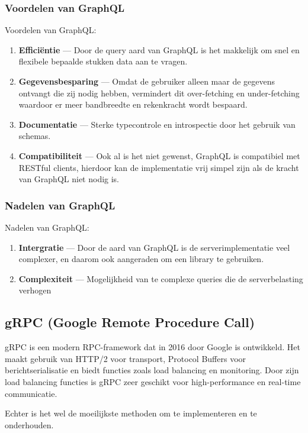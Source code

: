 \subsubsection{Voordelen van GraphQL}
Voordelen van GraphQL:
\begin{enumerate}
    \item \textbf{Efficiëntie} --- Door de query aard van GraphQL is het
     makkelijk om snel en flexibele bepaalde stukken data aan te vragen.
    \item \textbf{Gegevensbesparing} --- Omdat de gebruiker alleen maar de
     gegevens ontvangt die zij nodig hebben, vermindert dit over-fetching en
     under-fetching waardoor er meer bandbreedte en rekenkracht wordt bespaard.\cite{Hartig}
    \item \textbf{Documentatie} --- Sterke typecontrole en introspectie door het
     gebruik van schemas.
     \item \textbf{Compatibiliteit} --- Ook al is het niet gewenst, GraphQL
      is compatibiel met RESTful clients, hierdoor kan de implementatie vrij
      simpel zijn als de kracht van GraphQL niet nodig is.
\end{enumerate}

\subsubsection{Nadelen van GraphQL}
Nadelen van GraphQL:
\begin{enumerate}
    \item \textbf{Intergratie} --- Door de aard van GraphQL is de
     serverimplementatie veel complexer, en daarom ook aangeraden om een library
     te gebruiken.
    \item \textbf{Complexiteit} --- Mogelijkheid van te complexe queries die
     de serverbelasting verhogen
\end{enumerate}

\subsection{gRPC (Google Remote Procedure Call)}
gRPC is een modern RPC-framework dat in 2016 door Google is ontwikkeld. Het maakt
gebruik van HTTP/2 voor transport, Protocol Buffers voor berichtserialisatie en
biedt functies zoals load balancing en monitoring. Door zijn load balancing
functies is gRPC zeer geschikt voor high-performance en real-time communicatie.\cite{google,Śliwa_Pańczyk_2021}

Echter is het wel de moeilijkste methoden om te implementeren en te onderhouden.


